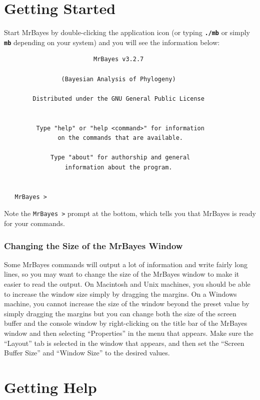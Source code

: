 \documentclass[12pt]{book}
\newcommand{\ttt}[1]{\texttt{#1}}
\newcommand{\tb}[1]{\ttt{\textbf{#1}}}
\begin{document}
\section{Getting Started}

Start MrBayes by double-clicking the application icon (or typing \tb{./mb} or simply \tb{mb}
depending on your system) and you will see the information below:

\begin{singlespacing}
\footnotesize
\begin{verbatim}
                         MrBayes v3.2.7

                (Bayesian Analysis of Phylogeny)

        Distributed under the GNU General Public License


         Type "help" or "help <command>" for information
               on the commands that are available.

             Type "about" for authorship and general
                 information about the program.


   MrBayes >
\end{verbatim}
\normalsize
\end{singlespacing}

Note the \ttt{MrBayes >} prompt at the bottom, which tells you that MrBayes is ready for your
commands.

\subsubsection{Changing the Size of the MrBayes Window}

Some MrBayes commands will output a lot of information and write fairly long lines, so you may want
to change the size of the MrBayes window to make it easier to read the output. On Macintosh and
Unix machines, you should be able to increase the window size simply by dragging the margins. On a
Windows machine, you cannot increase the size of the window beyond the preset value by simply
dragging the margins but you can change both the size of the screen buffer and the console window
by right-clicking on the title bar of the MrBayes window and then selecting ``Properties'' in the
menu that appears. Make sure the ``Layout'' tab is selected in the window that appears, and then
set the ``Screen Buffer Size'' and ``Window Size'' to the desired values.

\section{Getting Help}
\label{gettingHelp}
\end{document}
